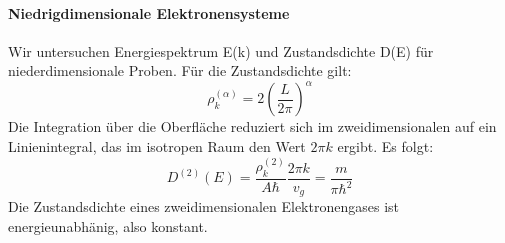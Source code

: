 \documentclass[11pt]{article}
\begin{document}
\noindent \paragraph{Niedrigdimensionale Elektronensysteme}
Wir untersuchen Energiespektrum E(k) und Zustandsdichte D(E) für
niederdimensionale Proben. Für die Zustandsdichte gilt:
\begin{equation}
  \rho_k^{(\alpha)}=2\left(\frac{L}{2\pi}\right)^{\alpha}
\end{equation}
Die Integration über die Oberfläche reduziert sich im zweidimensionalen auf ein
Linienintegral, das im isotropen Raum den Wert $2\pi k$ ergibt. Es folgt:
\begin{equation}
  D^{(2)}(E)=\frac{\rho_k^{(2)}}{A\hbar}\frac{2\pi k}{v_g}=\frac{m}{\pi\hbar^2}
\end{equation}
Die Zustandsdichte eines zweidimensionalen Elektronengases ist energieunabhänig,
also konstant.
\end{document}

